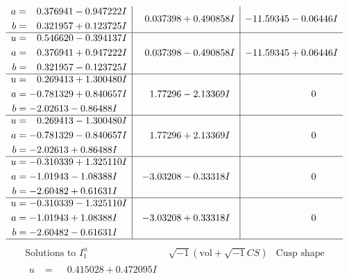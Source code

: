 \documentclass[1p]{elsarticle_modified}
\theoremstyle{definition}
\newcommand{\I}{\sqrt{-1}}
\begin{document}
$$\begin{array}{c|c|c}
\begin{aligned}
a &= \phantom{-}0.376941 - 0.947222 I \\
b &= \phantom{-}0.321957 + 0.123725 I\end{aligned}
 & \phantom{-}0.037398 + 0.490858 I & -11.59345 - 0.06446 I \\ \hline\begin{aligned}
u &= \phantom{-}0.546620 - 0.394137 I \\
a &= \phantom{-}0.376941 + 0.947222 I \\
b &= \phantom{-}0.321957 - 0.123725 I\end{aligned}
 & \phantom{-}0.037398 - 0.490858 I & -11.59345 + 0.06446 I \\ \hline\begin{aligned}
u &= \phantom{-}0.269413 + 1.300480 I \\
a &= -0.781329 + 0.840657 I \\
b &= -2.02613 - 0.86488 I\end{aligned}
 & \phantom{-}1.77296 - 2.13369 I & \phantom{-0.000000 } 0 \\ \hline\begin{aligned}
u &= \phantom{-}0.269413 - 1.300480 I \\
a &= -0.781329 - 0.840657 I \\
b &= -2.02613 + 0.86488 I\end{aligned}
 & \phantom{-}1.77296 + 2.13369 I & \phantom{-0.000000 } 0 \\ \hline\begin{aligned}
u &= -0.310339 + 1.325110 I \\
a &= -1.01943 - 1.08388 I \\
b &= -2.60482 + 0.61631 I\end{aligned}
 & -3.03208 - 0.33318 I & \phantom{-0.000000 } 0 \\ \hline\begin{aligned}
u &= -0.310339 - 1.325110 I \\
a &= -1.01943 + 1.08388 I \\
b &= -2.60482 - 0.61631 I\end{aligned}
 & -3.03208 + 0.33318 I & \phantom{-0.000000 } 0\\
 \hline 
 \end{array}$$\newpage$$\begin{array}{c|c|c}  
\text{Solutions to }I^u_{1}& \I (\text{vol} + \sqrt{-1}CS) & \text{Cusp shape}\\
 \hline 
\begin{aligned}
u &= \phantom{-}0.415028 + 0.472095 I \\

\end{aligned}
\end{array}$$
\end{document}
